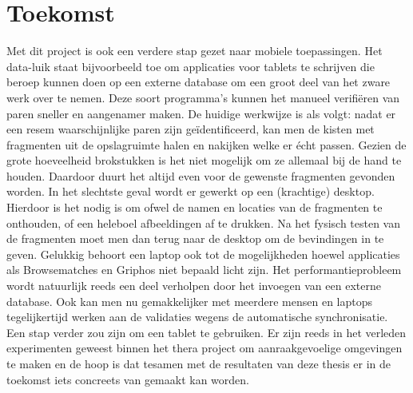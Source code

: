 \section{Toekomst}
Met dit project is ook een verdere stap gezet naar mobiele toepassingen. Het data-luik staat bijvoorbeeld toe om applicaties voor tablets te schrijven die beroep kunnen doen op een externe database om een groot deel van het zware werk over te nemen. Deze soort programma's kunnen het manueel verifi\"eren van paren sneller en aangenamer maken. De huidige werkwijze is als volgt: nadat er een resem waarschijnlijke paren zijn ge\"identificeerd, kan men de kisten met fragmenten uit de opslagruimte halen en nakijken welke er \'echt passen. Gezien de grote hoeveelheid brokstukken is het niet mogelijk om ze allemaal bij de hand te houden. Daardoor duurt het altijd even voor de gewenste fragmenten gevonden worden. In het slechtste geval wordt er gewerkt op een (krachtige) desktop. Hierdoor is het nodig is om ofwel de namen en locaties van de fragmenten te onthouden, of een heleboel afbeeldingen af te drukken. Na het fysisch testen van de fragmenten moet men dan terug naar de desktop om de bevindingen in te geven. Gelukkig behoort een laptop ook tot de mogelijkheden hoewel applicaties als Browsematches en Griphos niet bepaald licht zijn. Het performantieprobleem wordt natuurlijk reeds een deel verholpen door het invoegen van een externe database. Ook kan men nu gemakkelijker met meerdere mensen en laptops tegelijkertijd werken aan de validaties wegens de automatische synchronisatie. Een stap verder zou zijn om een tablet te gebruiken. Er zijn reeds in het verleden experimenten geweest binnen het thera project om aanraakgevoelige omgevingen te maken en de hoop is dat tesamen met de resultaten van deze thesis er in de toekomst iets concreets van gemaakt kan worden.
